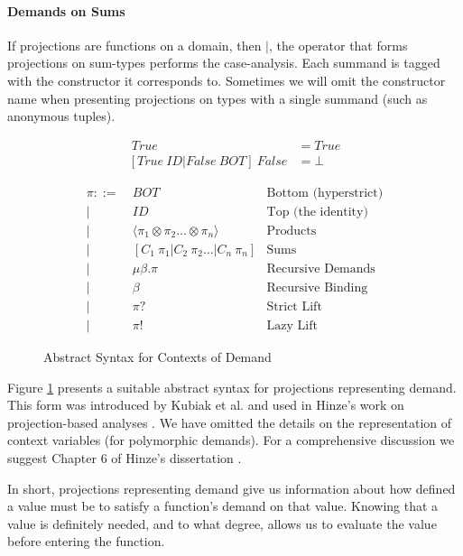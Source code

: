 \documentclass[preprint]{sigplanconf}
\begin{document}
\paragraph{Demands on Sums} If projections are functions on a domain, then
\nolinebreak $|$, the operator that forms projections on sum-types performs the
case-analysis. Each summand is tagged with the constructor it corresponds to.
Sometimes we will omit the constructor name when presenting projections on
types with a single summand (such as anonymous tuples).

\begin{align*}
[True\ ID | False\ ID]  \ True &= True \\
[True\ ID | False\ BOT] \ False &= \bot
\end{align*}

\begin{figure}
\begin{align*}
    \pi ::=&\ BOT              & \text{Bottom (hyperstrict)} \\
        |&\ ID               & \text{Top (the identity)} \\
        |&\ \langle \pi_{1} \otimes \pi_{2} \dots \otimes \pi_{n} \rangle   & \text{Products} \\ 
        |&\ [C_{1} \ \pi_{1} | C_{2} \ \pi_{2} \dots | C_{n} \ \pi_{n}]    & \text{Sums} \\ 
        |&\ \mu\beta . \pi     & \text{Recursive Demands} \\
        |&\ \beta              & \text{Recursive Binding} \\
        |&\ \pi?               & \text{Strict Lift} \\
        |&\ \pi!               & \text{Lazy Lift}
\end{align*}
\caption{Abstract Syntax for Contexts of Demand}
\label{fig:ContextAST}
\end{figure}


Figure \ref{fig:ContextAST}  presents a
suitable abstract syntax for projections representing demand.  This form was
introduced by Kubiak et al. and used in Hinze's work on projection-based
analyses \citep{kubiak, hinze1995projection}.  We have omitted the details on
the representation of context variables (for polymorphic demands). For a
comprehensive discussion we suggest Chapter 6 of Hinze's dissertation
\citep{hinze1995projection}.

In short, projections representing demand give us information about how defined
a value must be to satisfy a function's demand on that value. Knowing that a
value is definitely needed, and to what degree, allows us to evaluate the value
before entering the function.
\end{document}
